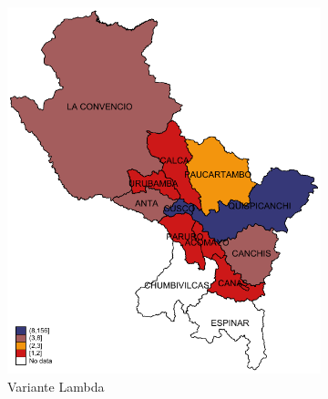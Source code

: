 \documentclass[12pt,a4paper,openany]{book}
\begin{document}
			\begin{figure}[h]
				\caption{Distribución provincial de las variantes de SARS-Cov-2 aisladas en la Región Cusco, hasta la SE 51.}
				\label{fig:mapa_variantes}
				\centering
				\begin{subfigure}[b]{0.40\textwidth}
					\centering
					\includegraphics[width=\textwidth]{../figuras/variantes_provincial_lambda.pdf}
					\caption{Variante Lambda}
				\end{subfigure}
				\hfill
				\begin{subfigure}[b]{0.40\textwidth}
					\centering

\end{subfigure}
\end{figure}
\end{document}
